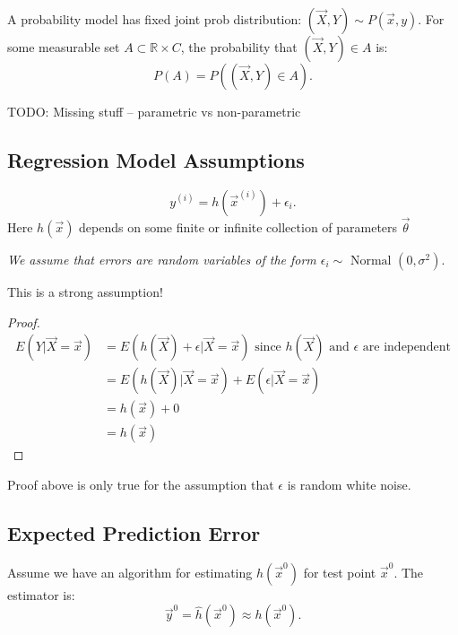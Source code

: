 \documentclass[a4paper]{article}
\begin{document}
  \begin{remark}
    A probability model has fixed joint prob distribution: $(\vec{X}, Y) \sim P(\vec{x}, y)$. For some measurable set $A \subset \mathbb{R} \times C$,
    the probability that $(\vec{X}, Y) \in A$ is:
    \[
      P(A) = P((\vec{X}, Y) \in A)
    .\] 
  \end{remark}

  TODO: Missing stuff -- parametric vs non-parametric

  \subsection{Regression Model Assumptions}
  \[
   y^{(i)} = h(\vec{x}^{(i)}) + \epsilon_i
  .\] 
  Here $h(\vec{x})$ depends on some finite or infinite collection of parameters $\vec{\theta}$
  
  \textit{We assume that errors are random variables of the form $\epsilon_i \sim \text{ Normal }(0, \sigma^2)$}. 
  \begin{remark}
    This is a strong assumption!
  \end{remark}


\begin{proof}
    \begin{align}
        E(Y | \vec{X} = \vec{x}) &= E(h(\vec{X}) + \epsilon | \vec{X} = \vec{x}) \text{ since $h(\vec{X})$ and $\epsilon$ are independent} \\
                                 &= E(h(\vec{X}) | \vec{X} = \vec{x}) + E(\epsilon | \vec{X} = \vec{x}) \\
                                 &= h(\vec{x}) + 0 \\
                                 &= h(\vec{x})
    \end{align}
\end{proof}

\begin{remark}
  Proof above is only true for the assumption that $\epsilon$ is random white noise.
  
\end{remark}

\subsection{Expected Prediction Error}
  Assume we have an algorithm for estimating $h(\vec{x}^0)$ for test point $\vec{x}^0$. The estimator is:
  \[
    \vec{y}^0 = \hat{h}(\vec{x}^0) \approx h(\vec{x}^0)
  .\] 
  
\end{document}
